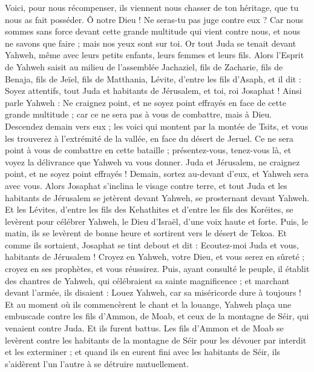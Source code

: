 \begin{multicols}{2}
Voici, pour nous récompenser, ils viennent nous chasser de ton héritage, que tu nous as fait posséder.
Ô notre Dieu ! Ne seras-tu pas juge contre eux ? Car nous sommes sans force devant cette grande multitude qui vient contre nous, et nous ne savons que faire ; mais nos yeux sont sur toi.
Or tout Juda se tenait devant Yahweh, même avec leurs petits enfants, leurs femmes et leurs fils.
Alors l'Esprit de Yahweh saisit au milieu de l'assemblée Jachaziel, fils de Zacharie, fils de Benaja, fils de Jeïel, fils de Matthania, Lévite, d'entre les fils d'Asaph,
et il dit : Soyez attentifs, tout Juda et habitants de Jérusalem, et toi, roi Josaphat ! Ainsi parle Yahweh : Ne craignez point, et ne soyez point effrayés en face de cette grande multitude ; car ce ne sera pas à vous de combattre, mais à Dieu.
Descendez demain vers eux ; les voici qui montent par la montée de Tsits, et vous les trouverez à l'extrémité de la vallée, en face du désert de Jeruel.
Ce ne sera point à vous de combattre en cette bataille ; présentez-vous, tenez-vous là, et voyez la délivrance que Yahweh va vous donner. Juda et Jérusalem, ne craignez point, et ne soyez point effrayés ! Demain, sortez au-devant d'eux, et Yahweh sera avec vous.
Alors Josaphat s'inclina le visage contre terre, et tout Juda et les habitants de Jérusalem se jetèrent devant Yahweh, se prosternant devant Yahweh.
Et les Lévites, d'entre les fils des Kehathites et d'entre les fils des Koréites, se levèrent pour célébrer Yahweh, le Dieu d'Israël, d'une voix haute et forte.
Puis, le matin, ils se levèrent de bonne heure et sortirent vers le désert de Tekoa. Et comme ils sortaient, Josaphat se tint debout et dit : Ecoutez-moi Juda et vous, habitants de Jérusalem ! Croyez en Yahweh, votre Dieu, et vous serez en sûreté ; croyez en ses prophètes, et vous réussirez.
Puis, ayant consulté le peuple, il établit des chantres de Yahweh, qui célébraient sa sainte magnificence ; et marchant devant l'armée, ils disaient : Louez Yahweh, car sa miséricorde dure à toujours !
Et au moment où ils commencèrent le chant et la louange, Yahweh plaça une embuscade contre les fils d'Ammon, de Moab, et ceux de la montagne de Séir, qui venaient contre Juda. Et ils furent battus.
Les fils d'Ammon et de Moab se levèrent contre les habitants de la montagne de Séir pour les dévouer par interdit et les exterminer ; et quand ils en eurent fini avec les habitants de Séir, ils s'aidèrent l'un l'autre à se détruire mutuellement.

\end{multicols}
